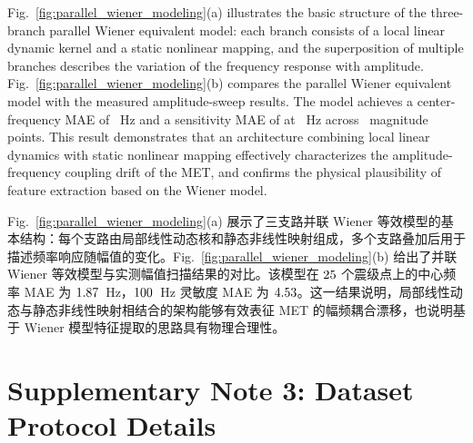 \documentclass[sn-nature]{sn-jnl}
\newif\ifCNENEnglish
\newif\ifCNENBilingual
\newcommand{\CNEN}[2]{%
    \ifCNENBilingual
        #1%
        \if\relax\detokenize{#2}\relax\else\par #2\fi%
    \else
        \ifCNENEnglish
            #2%
        \else
            #1%
        \fi
    \fi
}
\begin{document}
\CNEN{Fig.~\ref{fig:parallel_wiener_modeling}(a) 展示了三支路并联 Wiener 等效模型的基本结构：每个支路由局部线性动态核和静态非线性映射组成，多个支路叠加后用于描述频率响应随幅值的变化。Fig.~\ref{fig:parallel_wiener_modeling}(b) 给出了并联 Wiener 等效模型与实测幅值扫描结果的对比。该模型在 $25$ 个震级点上的中心频率 MAE 为 $1.87$~Hz，$100$~Hz 灵敏度 MAE 为 $4.53$。这一结果说明，局部线性动态与静态非线性映射相结合的架构能够有效表征 MET 的幅频耦合漂移，也说明基于 Wiener 模型特征提取的思路具有物理合理性。}{Fig.~\ref{fig:parallel_wiener_modeling}(a) illustrates the basic structure of the three-branch parallel Wiener equivalent model: each branch consists of a local linear dynamic kernel and a static nonlinear mapping, and the superposition of multiple branches describes the variation of the frequency response with amplitude. Fig.~\ref{fig:parallel_wiener_modeling}(b) compares the parallel Wiener equivalent model with the measured amplitude-sweep results. The model achieves a center-frequency MAE of \valWienerParallelCfMae~Hz and a sensitivity MAE of \valWienerParallelGainMae at \valWienerParallelGainFreq~Hz across \valWienerParallelAmpCount~magnitude points. This result demonstrates that an architecture combining local linear dynamics with static nonlinear mapping effectively characterizes the amplitude-frequency coupling drift of the MET, and confirms the physical plausibility of feature extraction based on the Wiener model.%
}


\section{Supplementary Note 3: Dataset Protocol Details}
\end{document}
